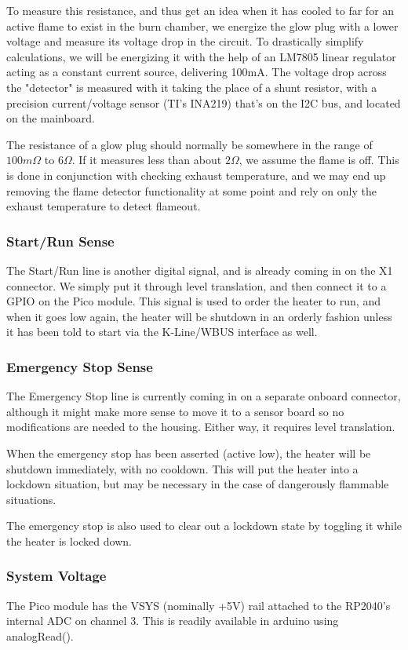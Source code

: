 \documentclass[lettersize,journal]{IEEEtran}
\begin{document}
To measure this resistance, and thus get an idea when it has cooled to far for an active flame to exist in the burn chamber, we energize the glow plug with a lower voltage and measure its voltage drop in the circuit.  To drastically simplify calculations, we will be energizing it with the help of an LM7805 linear regulator acting as a constant current source, delivering 100mA.  The voltage drop across the "detector" is measured with it taking the place of a shunt resistor, with a precision current/voltage sensor (TI's INA219) that's on the I2C bus, and located on the mainboard.

The resistance of a glow plug should normally be somewhere in the range of $100 m \Omega$ to $6 \Omega$.  If it measures less than about $2 \Omega$, we assume the flame is off.  This is done in conjunction with checking exhaust temperature, and we may end up removing the flame detector functionality at some point and rely on only the exhaust temperature to detect flameout.

\subsubsection{Start/Run Sense}
The Start/Run line is another digital signal, and is already coming in on the X1 connector.  We simply put it through level translation, and then connect it to a GPIO on the Pico module.  This signal is used to order the heater to run, and when it goes low again, the heater will be shutdown in an orderly fashion unless it has been told to start via the K-Line/WBUS interface as well.

\subsubsection{Emergency Stop Sense}
The Emergency Stop line is currently coming in on a separate onboard connector, although it might make more sense to move it to a sensor board so no modifications are needed to the housing.  Either way, it requires level translation.

When the emergency stop has been asserted (active low), the heater will be shutdown immediately, with no cooldown.  This will put the heater into a lockdown situation, but may be necessary in the case of dangerously flammable situations.

The emergency stop is also used to clear out a lockdown state by toggling it while the heater is locked down.

\subsubsection{System Voltage}
The Pico module has the VSYS (nominally +5V) rail attached to the RP2040's internal ADC on channel 3.  This is readily available in arduino using analogRead().
\end{document}
